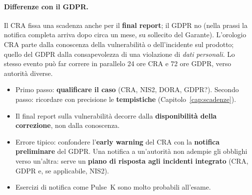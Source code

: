 \paragraph{Differenze con il GDPR.} Il CRA fissa una scadenza anche per il \textbf{final report}; il GDPR
no (nella prassi la notifica completa arriva dopo circa un mese, su sollecito del Garante). L'orologio
CRA parte dalla conoscenza della vulnerabilità o dell'incidente sul prodotto; quello del GDPR dalla
consapevolezza di una violazione di \emph{dati personali}. Lo stesso evento può far correre in parallelo
24 ore CRA e 72 ore GDPR, verso autorità diverse.

\begin{esame}
\begin{itemize}
  \item Primo passo: \textbf{qualificare il caso} (CRA, NIS2, DORA, GDPR?). Secondo passo: ricordare con
    precisione le \textbf{tempistiche} (Capitolo~\ref{cap:scadenze}).
  \item Il final report sulla vulnerabilità decorre dalla \textbf{disponibilità della correzione}, non
    dalla conoscenza.
  \item Errore tipico: confondere l'\textbf{early warning} del CRA con la \textbf{notifica preliminare}
    del GDPR. Una notifica a un'autorità non adempie gli obblighi verso un'altra: serve un
    \textbf{piano di risposta agli incidenti integrato} (CRA, GDPR e, se applicabile, NIS2).
  \item Esercizi di notifica come Pulse~K sono molto probabili all'esame.
\end{itemize}
\end{esame}

